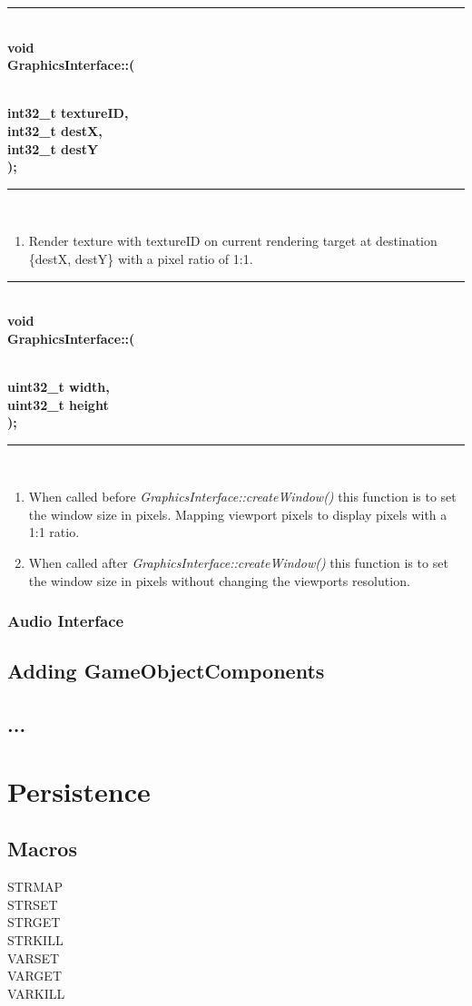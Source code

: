 \documentclass[12pt]{article}
\newcommand{\param}[1]{\indent\phantom{indent} \textbf{#1}\\ }
\newenvironment{func}[3]%
{%
	\noindent\ignorespaces
	\rule{\textwidth} {1pt} \\
	\textbf{#1\\#2::{\Large \color{blue}{#3}}(} \\ \\
	\noindent\ignorespaces
}%
{%
	\textbf{);} \\
	\ignorespacesafterend
	\rule{\textwidth} {0.01pt} \\
}
\begin{document}
\begin{func}{void}{GraphicsInterface}{basicRenderCopy}
\param{int32\_t textureID,}
\param{int32\_t destX,}
\param{int32\_t destY}
\end{func}
\begin{enumerate}
\item Render texture with textureID on current rendering target at destination \{destX, destY\} with a pixel ratio of 1:1.
\end{enumerate}

\begin{func}{void}{GraphicsInterface}{setWindowSize}
\param{uint32\_t width,}
\param{uint32\_t height}
\end{func}
\begin{enumerate}
\item When called before \textit{GraphicsInterface::createWindow()} this function is to set the window size in pixels. Mapping viewport pixels to display pixels with a 1:1 ratio.\\
\item When called after \textit{GraphicsInterface::createWindow()} this function is to set the window size in pixels without changing the viewports resolution. \\
\end{enumerate}

\subsubsection{Audio Interface}
\subsection{Adding GameObjectComponents}
\subsection{...}

\section{Persistence}
\subsection{Macros}
STRMAP\\
STRSET\\
STRGET\\
STRKILL\\
VARSET\\
VARGET\\
VARKILL\\
\end{document}

